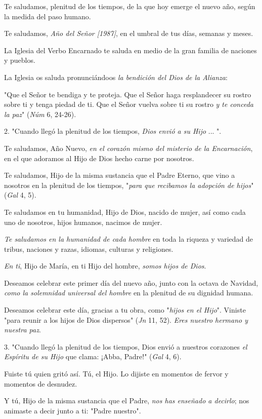 \begin{body}
Te saludamos, plenitud de los tiempos, de la que hoy emerge el nuevo año, según la medida del paso humano.

Te saludamos, \emph{Año del Señor {[}1987{]}}, en el umbral de tus días, semanas y meses.

La Iglesia del Verbo Encarnado te saluda en medio de la gran familia de naciones y pueblos.

La Iglesia os saluda pronunciándoos \emph{la bendición del Dios de la 	Alianza}:

"Que el Señor te bendiga y te proteja. Que el Señor haga resplandecer su rostro sobre ti y tenga piedad de ti. Que el Señor vuelva sobre ti su rostro \emph{y te conceda la paz}" (\emph{Núm} 6, 24-26).

2. "Cuando llegó la plenitud de los tiempos, \emph{Dios envió a su Hijo} ... ".

Te saludamos, Año Nuevo, \emph{en el corazón mismo del misterio de la 	Encarnación}, en el que adoramos al Hijo de Dios hecho carne por nosotros.

Te saludamos, Hijo de la misma sustancia que el Padre Eterno, que vino a nosotros en la plenitud de los tiempos, "\emph{para que recibamos la 	adopción de hijos}" (\emph{Gal} 4, 5).

Te saludamos en tu humanidad, Hijo de Dios, nacido de mujer, así como cada uno de nosotros, hijos humanos, nacimos de mujer.

\emph{Te saludamos en la humanidad de cada hombre} en toda la riqueza y variedad de tribus, naciones y razas, idiomas, culturas y religiones.

\emph{En ti}, Hijo de María, en ti Hijo del hombre, \emph{somos hijos de 	Dios}.

Deseamos celebrar este primer día del nuevo año, junto con la octava de Navidad, \emph{como la solemnidad universal del hombre} en la plenitud de su dignidad humana.

Deseamos celebrar este día, gracias a tu obra, como "\emph{hijos en el 	Hijo}". Viniste "para reunir a los hijos de Dios dispersos" (\emph{Jn} 11, 52). \emph{Eres nuestro hermano y nuestra paz}.

3. "Cuando llegó la plenitud de los tiempos, Dios envió a nuestros corazones \emph{el Espíritu de su Hijo} que clama: ¡Abba, Padre!" (\emph{Gal} 4, 6).

Fuiste tú quien gritó así. Tú, el Hijo. Lo dijiste en momentos de fervor y momentos de desnudez.

Y tú, Hijo de la misma sustancia que el Padre, \emph{nos has enseñado a 	decirlo}; nos animaste a decir junto a ti: "Padre nuestro".


\end{body}
